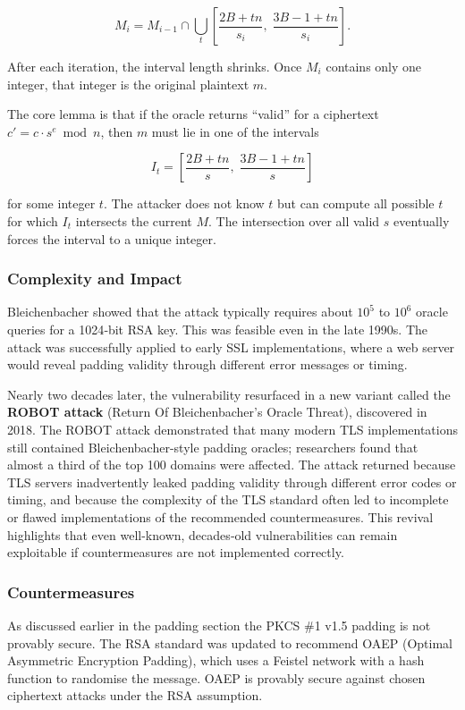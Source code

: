 \[
M_i = M_{i-1} \cap \bigcup_{t} \left[ \frac{2B + t n}{s_i},\; \frac{3B-1 + t n}{s_i} \right].
\]

After each iteration, the interval length shrinks. Once \(M_i\) contains only one integer, that integer is the original plaintext \(m\).


 The core lemma is that if the oracle returns “valid” for a ciphertext \(c' = c \cdot s^e \bmod n\), then \(m\) must lie in one of the intervals

\[
I_t = \left[ \frac{2B + t n}{s},\; \frac{3B-1 + t n}{s} \right]
\]

for some integer \(t\). The attacker does not know \(t\) but can compute all possible \(t\) for which \(I_t\) intersects the current \(M\). The intersection over all valid \(s\) eventually forces the interval to a unique integer.

\subsubsection*{Complexity and Impact}

Bleichenbacher showed that the attack typically requires about \(10^5\) to \(10^6\) oracle queries for a 1024‑bit RSA key. This was feasible even in the late 1990s. The attack was successfully applied to early SSL implementations, where a web server would reveal padding validity through different error messages or timing.

Nearly two decades later, the vulnerability resurfaced in a new variant called the \textbf{ROBOT attack} (Return Of Bleichenbacher's Oracle Threat), discovered in 2018. The ROBOT attack demonstrated that many modern TLS implementations still contained Bleichenbacher-style padding oracles; researchers found that almost a third of the top 100 domains were affected. The attack returned because TLS servers inadvertently leaked padding validity through different error codes or timing, and because the complexity of the TLS standard often led to incomplete or flawed implementations of the recommended countermeasures. This revival highlights that even well-known, decades‑old vulnerabilities can remain exploitable if countermeasures are not implemented correctly.

\subsubsection*{Countermeasures}

As discussed earlier in the padding section the PKCS \#1 v1.5 padding is not provably secure. The RSA standard was updated to recommend OAEP (Optimal Asymmetric Encryption Padding), which uses a Feistel network with a hash function to randomise the message. OAEP is provably secure against chosen ciphertext attacks under the RSA assumption.

